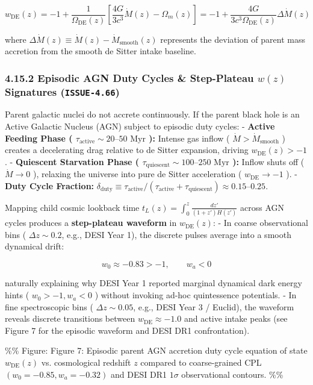 \documentclass[11pt,a4paper]{article}
\theoremstyle{definition}\newtheorem{definition}{Definition}
\theoremstyle{remark}\newtheorem{remark}{Remark}
\begin{document}
\begin{equation}
\boxed{w_{\text{DE}}(z) = -1 + \frac{1}{\Omega_{\text{DE}}(z)}\left[ \frac{4G}{3c^3}\dot{M}(z) - \Omega_m(z) \right] = -1 + \frac{4G}{3c^3 \Omega_{\text{DE}}(z)} \Delta\dot{M}(z)}
\end{equation}


where $\Delta\dot{M}(z) \equiv \dot{M}(z) - \dot{M}_{\text{smooth}}(z)$ represents the deviation of parent mass accretion from the smooth de Sitter intake baseline.
\subsubsection{4.15.2 Episodic AGN Duty Cycles \& Step-Plateau $w(z)$ Signatures (\texttt{ISSUE-4.66})}

Parent galactic nuclei do not accrete continuously. If the parent black hole is an Active Galactic Nucleus (AGN) subject to episodic duty cycles:
- \textbf{Active Feeding Phase ( $\tau_{\text{active}} \sim 20\text{--}50\text{ Myr}$ ):} Intense gas inflow ( $\dot{M} > \dot{M}_{\text{smooth}}$ ) creates a decelerating drag relative to de Sitter expansion, driving $w_{\text{DE}}(z) > -1$.
- \textbf{Quiescent Starvation Phase ( $\tau_{\text{quiescent}} \sim 100\text{--}250\text{ Myr}$ ):} Inflow shuts off ( $\dot{M} \to 0$ ), relaxing the universe into pure de Sitter acceleration ( $w_{\text{DE}} \to -1$ ).
- \textbf{Duty Cycle Fraction:} $\delta_{\text{duty}} \equiv \tau_{\text{active}} / (\tau_{\text{active}} + \tau_{\text{quiescent}}) \approx 0.15\text{--}0.25$.

Mapping child cosmic lookback time $t_L(z) = \int_0^z \frac{dz'}{(1+z')H(z')}$ across AGN cycles produces a \textbf{step-plateau waveform} in $w_{\text{DE}}(z)$:
- In coarse observational bins ( $\Delta z \sim 0.2$, e.g., DESI Year 1), the discrete pulses average into a smooth dynamical drift:


\begin{equation}
w_0 \approx -0.83 > -1, \qquad w_a < 0
\end{equation}


naturally explaining why DESI Year 1 reported marginal dynamical dark energy hints ( $w_0 > -1, w_a < 0$ ) without invoking ad-hoc quintessence potentials.
- In fine spectroscopic bins ( $\Delta z \sim 0.05$, e.g., DESI Year 3 / Euclid), the waveform reveals discrete transitions between $w_{\text{DE}} \approx -1.0$ and active intake peaks (see Figure 7 for the episodic waveform and DESI DR1 confrontation).

\%\% Figure: Figure 7: Episodic parent AGN accretion duty cycle equation of state $w_{\text{DE}}(z)$ vs. cosmological redshift $z$ compared to coarse-grained CPL $(w_0 = -0.85, w_a = -0.32)$ and DESI DR1 $1\sigma$ observational contours. \%\%
\end{document}
